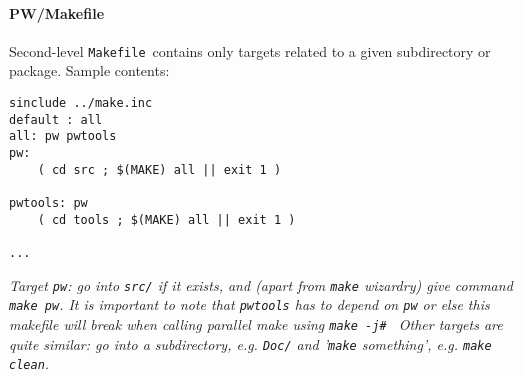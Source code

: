 \documentclass[12pt,a4paper]{article}
\def\Makefile{\texttt{Makefile}}
\begin{document}
\paragraph{PW/Makefile}
Second-level \Makefile\ contains only targets related to a given
subdirectory or package. Sample contents:
\begin{verbatim}
sinclude ../make.inc
default : all
all: pw pwtools
pw:
    ( cd src ; $(MAKE) all || exit 1 )

pwtools: pw
    ( cd tools ; $(MAKE) all || exit 1 )

...
\end{verbatim}
{\em Target {\tt pw}: go into {\tt src/} if it exists, and (apart
from \texttt{make} wizardry) give command {\tt make pw}. It is important
to note that {\tt pwtools} has to depend on {\tt pw} or else this
makefile will break when calling parallel make using {\tt make -j\# }
Other targets are quite similar: go into a subdirectory, e.g.
{\tt Doc/} and '{\tt make} something', e.g. {\tt make clean}.}
\end{document}
